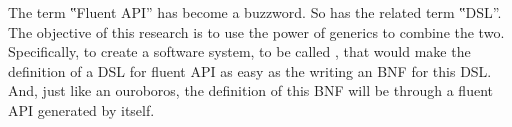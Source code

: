 The term ‟Fluent API” has become a buzzword. So has the related term
‟DSL”. The objective of this research is to use the power of \Java generics
to combine the two. Specifically, to create a software system, to be called
\Self, that would make the definition of a DSL for fluent API as easy as the
writing an BNF for this DSL\@. And, just like an ouroboros, the definition of this
BNF will be through a fluent API generated by \Self itself.
